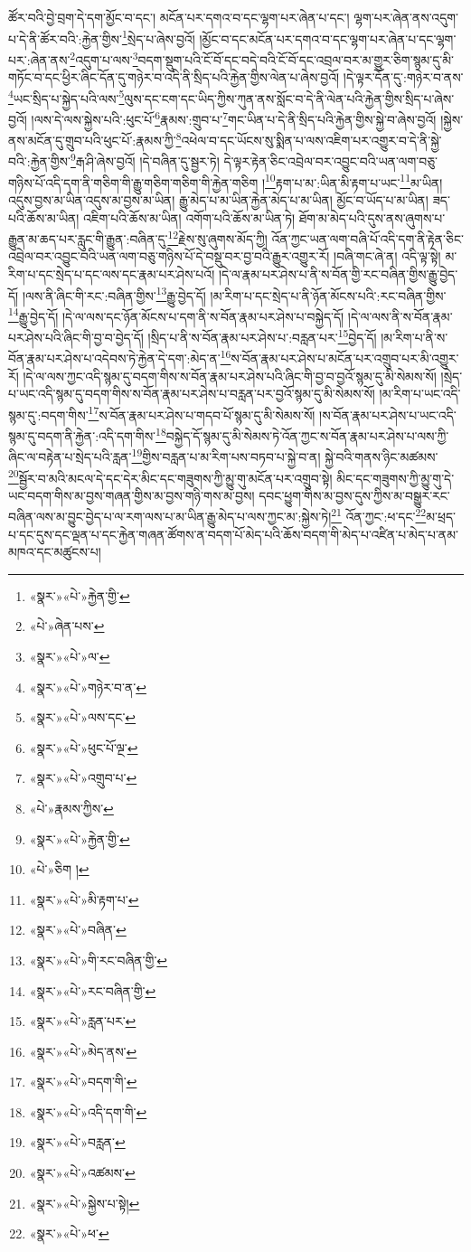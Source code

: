 ཚོར་བའི་བྱེ་བྲག་དེ་དག་མྱོང་བ་དང་། མངོན་པར་དགའ་བ་དང་ལྷག་པར་ཞེན་པ་དང་། ལྷག་པར་ཞེན་ནས་འདུག་པ་དེ་ནི་ཚོར་བའི་:རྐྱེན་གྱིས་\footnote{«སྣར་»«པེ་»རྐྱེན་གྱི་}སྲེད་པ་ཞེས་བྱའོ། །མྱོང་བ་དང་མངོན་པར་དགའ་བ་དང་ལྷག་པར་ཞེན་པ་དང་ལྷག་པར་:ཞེན་ནས་\footnote{«པེ་»ཞེན་པས་}འདུག་པ་ལས་\footnote{«སྣར་»«པེ་»ལ་}བདག་སྡུག་པའི་ངོ་བོ་དང་བདེ་བའི་ངོ་བོ་དང་འབྲལ་བར་མ་གྱུར་ཅིག་སྙམ་དུ་མི་གཏོང་བ་དང་ཕྱིར་ཞིང་དོན་དུ་གཉེར་བ་འདི་ནི་སྲིད་པའི་རྐྱེན་གྱིས་ལེན་པ་ཞེས་བྱའོ། །དེ་ལྟར་དོན་དུ་:གཉེར་བ་ནས་\footnote{«སྣར་»«པེ་»གཉེར་བ་ན་}ཡང་སྲིད་པ་སྐྱེད་པའི་ལས་\footnote{«སྣར་»«པེ་»ལས་དང་}ལུས་དང་ངག་དང་ཡིད་ཀྱིས་ཀུན་ནས་སློང་བ་དེ་ནི་ལེན་པའི་རྐྱེན་གྱིས་སྲིད་པ་ཞེས་བྱའོ། །ལས་དེ་ལས་སྐྱེས་པའི་:ཕུང་པོ་\footnote{«སྣར་»«པེ་»ཕུང་པོ་ལྔ་}རྣམས་:གྲུབ་པ་\footnote{«སྣར་»«པེ་»འགྲུབ་པ་}གང་ཡིན་པ་དེ་ནི་སྲིད་པའི་རྐྱེན་གྱིས་སྐྱེ་བ་ཞེས་བྱའོ། །སྐྱེས་ནས་མངོན་དུ་གྲུབ་པའི་ཕུང་པོ་:རྣམས་ཀྱི་\footnote{«པེ་»རྣམས་ཀྱིས་}འཕེལ་བ་དང་ཡོངས་སུ་སྨིན་པ་ལས་འཇིག་པར་འགྱུར་བ་དེ་ནི་སྐྱེ་བའི་:རྐྱེན་གྱིས་\footnote{«སྣར་»«པེ་»རྐྱེན་གྱི་}རྒ་ཤི་ཞེས་བྱའོ། །དེ་བཞིན་དུ་སྦྱར་ཏེ། དེ་ལྟར་རྟེན་ཅིང་འབྲེལ་བར་འབྱུང་བའི་ཡན་ལག་བཅུ་གཉིས་པོ་འདི་དག་ནི་གཅིག་གི་རྒྱུ་གཅིག་གཅིག་གི་རྐྱེན་གཅིག །\footnote{«པེ་»ཅིག །}རྟག་པ་མ་:ཡིན་མི་རྟག་པ་ཡང་\footnote{«སྣར་»«པེ་»མི་རྟག་པ་}མ་ཡིན། འདུས་བྱས་མ་ཡིན་འདུས་མ་བྱས་མ་ཡིན། རྒྱུ་མེད་པ་མ་ཡིན་རྐྱེན་མེད་པ་མ་ཡིན། མྱོང་བ་ཡོད་པ་མ་ཡིན། ཟད་པའི་ཆོས་མ་ཡིན། འཇིག་པའི་ཆོས་མ་ཡིན། འགོག་པའི་ཆོས་མ་ཡིན་ཏེ། ཐོག་མ་མེད་པའི་དུས་ནས་ཞུགས་པ་རྒྱུན་མ་ཆད་པར་རླུང་གི་རྒྱུན་:བཞིན་དུ་\footnote{«སྣར་»«པེ་»བཞིན་}རྗེས་སུ་ཞུགས་མོད་ཀྱི། འོན་ཀྱང་ཡན་ལག་བཞི་པོ་འདི་དག་ནི་རྟེན་ཅིང་འབྲེལ་བར་འབྱུང་བའི་ཡན་ལག་བཅུ་གཉིས་པོ་དེ་བསྡུ་བར་བྱ་བའི་རྒྱུར་འགྱུར་རོ། །བཞི་གང་ཞེ་ན། འདི་ལྟ་སྟེ། མ་རིག་པ་དང་སྲེད་པ་དང་ལས་དང་རྣམ་པར་ཤེས་པའོ། །དེ་ལ་རྣམ་པར་ཤེས་པ་ནི་ས་བོན་གྱི་རང་བཞིན་གྱིས་རྒྱུ་བྱེད་དོ། །ལས་ནི་ཞིང་གི་རང་:བཞིན་གྱིས་\footnote{«སྣར་»«པེ་»གི་རང་བཞིན་གྱི་}རྒྱུ་བྱེད་དོ། །མ་རིག་པ་དང་སྲེད་པ་ནི་ཉོན་མོངས་པའི་:རང་བཞིན་གྱིས་\footnote{«སྣར་»«པེ་»རང་བཞིན་གྱི་}རྒྱུ་བྱེད་དོ། །དེ་ལ་ལས་དང་ཉོན་མོངས་པ་དག་ནི་ས་བོན་རྣམ་པར་ཤེས་པ་བསྐྱེད་དོ། །དེ་ལ་ལས་ནི་ས་བོན་རྣམ་པར་ཤེས་པའི་ཞིང་གི་བྱ་བ་བྱེད་དོ། །སྲིད་པ་ནི་ས་བོན་རྣམ་པར་ཤེས་པ་:བརླན་པར་\footnote{«སྣར་»«པེ་»རླན་པར་}བྱེད་དོ། །མ་རིག་པ་ནི་ས་བོན་རྣམ་པར་ཤེས་པ་འདེབས་ཏེ་རྐྱེན་དེ་དག་:མེད་ན་\footnote{«སྣར་»«པེ་»མེད་ནས་}ས་བོན་རྣམ་པར་ཤེས་པ་མངོན་པར་འགྲུབ་པར་མི་འགྱུར་རོ། །དེ་ལ་ལས་ཀྱང་འདི་སྙམ་དུ་བདག་གིས་ས་བོན་རྣམ་པར་ཤེས་པའི་ཞིང་གི་བྱ་བ་བྱའོ་སྙམ་དུ་མི་སེམས་སོ། །སྲེད་པ་ཡང་འདི་སྙམ་དུ་བདག་གིས་ས་བོན་རྣམ་པར་ཤེས་པ་བརླན་པར་བྱའོ་སྙམ་དུ་མི་སེམས་སོ། །མ་རིག་པ་ཡང་འདི་སྙམ་དུ་:བདག་གིས་\footnote{«སྣར་»«པེ་»བདག་གི་}ས་བོན་རྣམ་པར་ཤེས་པ་གདབ་པོ་སྙམ་དུ་མི་སེམས་སོ། །ས་བོན་རྣམ་པར་ཤེས་པ་ཡང་འདི་སྙམ་དུ་བདག་ནི་རྐྱེན་:འདི་དག་གིས་\footnote{«སྣར་»«པེ་»འདི་དག་གི་}བསྐྱེད་དོ་སྙམ་དུ་མི་སེམས་ཏེ་འོན་ཀྱང་ས་བོན་རྣམ་པར་ཤེས་པ་ལས་ཀྱི་ཞིང་ལ་བརྟེན་པ་སྲེད་པའི་རླན་\footnote{«སྣར་»«པེ་»བརླན་}གྱིས་བརླན་པ་མ་རིག་པས་བཏབ་པ་སྐྱེ་བ་ན། སྐྱེ་བའི་གནས་ཉིང་མཚམས་\footnote{«སྣར་»«པེ་»འཚམས་}སྦྱོར་བ་མའི་མངལ་དེ་དང་དེར་མིང་དང་གཟུགས་ཀྱི་མྱུ་གུ་མངོན་པར་འགྲུབ་སྟེ། མིང་དང་གཟུགས་ཀྱི་མྱུ་གུ་དེ་ཡང་བདག་གིས་མ་བྱས་གཞན་གྱིས་མ་བྱས་གཉི་གས་མ་བྱས། དབང་ཕྱུག་གིས་མ་བྱས་དུས་ཀྱིས་མ་བསྒྱུར་རང་བཞིན་ལས་མ་བྱུང་བྱེད་པ་ལ་རག་ལས་པ་མ་ཡིན་རྒྱུ་མེད་པ་ལས་ཀྱང་མ་:སྐྱེས་ཏེ།\footnote{«སྣར་»«པེ་»སྐྱེས་པ་སྟེ།} འོན་ཀྱང་:ཕ་དང་\footnote{«སྣར་»«པེ་»ཕ་}མ་ཕྲད་པ་དང་དུས་དང་ལྡན་པ་དང་རྐྱེན་གཞན་ཚོགས་ན་བདག་པོ་མེད་པའི་ཆོས་བདག་གི་མེད་པ་འཛིན་པ་མེད་པ་ནམ་མཁའ་དང་མཚུངས་པ། 
